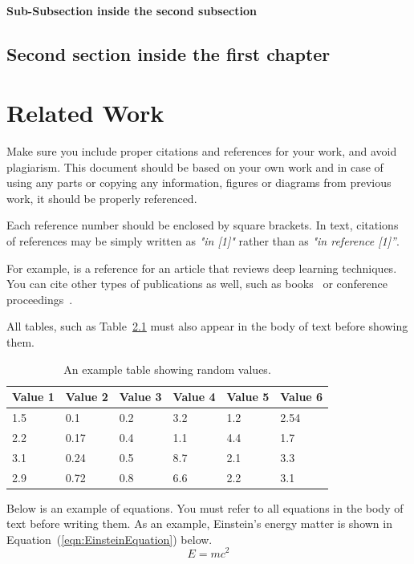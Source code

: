 \documentclass[
12pt,
oneside, 
onehalfspacing, 
nolistspacing, 
parskip, 
chapterinoneline, 
]{AASTCOMPUTER}
\begin{document}
\subsubsection{Sub-Subsection inside the second subsection}
\lipsum[2]

\section{Second section inside the first chapter}
\lipsum[6-7]

\chapter{Related Work}
Make sure you include proper citations and references for your work, and avoid plagiarism. This document should be based on your own work and in case of using any parts or copying any information, figures or diagrams from previous work, it should be properly referenced. 

Each reference number should be enclosed by square brackets. In text, citations of references may be simply written as \textit{"in [1]"} rather than as \textit{"in reference [1]”}.

For example, \cite{Sarker2021} is a reference for an article that reviews deep learning techniques. You can cite other types of publications as well, such as books~\cite{book1} or conference proceedings~\cite{conference1}.

\lipsum[5]
All tables, such as Table~\ref{tab:randomTable} must also appear in the body of text before showing them.

\begin{table}[!ht]
\caption{An example table showing random values.}
\label{tab:randomTable}
\centering
\begin{tabular}{|l|l|l|l|l|l|}
\hline
\textbf{Value 1} & \textbf{Value 2} & \textbf{Value 3} & \textbf{Value 4} & \textbf{Value 5} & \textbf{Value 6} \\
\hline
1.5 & 0.1 & 0.2 & 3.2 & 1.2 & 2.54\\
\hline
2.2 & 0.17 & 0.4 & 1.1 & 4.4 & 1.7\\
\hline
3.1 & 0.24 & 0.5 & 8.7 & 2.1 & 3.3\\
\hline
2.9 & 0.72 & 0.8 & 6.6 & 2.2 & 3.1\\
\hline
\end{tabular}
\end{table}
Below is an example of equations. You must refer to all equations in the body of text before writing them. As an example, Einstein's energy matter is shown in Equation~(\ref{eqn:EinsteinEquation}) below.  
\begin{equation}
E = mc^{2}
\label{eqn:EinsteinEquation}
\end{equation}
\end{document}
